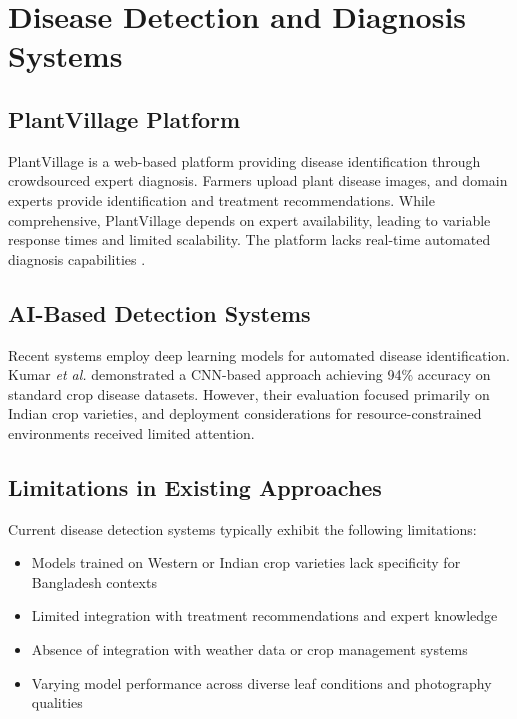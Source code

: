\documentclass[12pt,a4paper]{report}
\begin{document}
\section{Disease Detection and Diagnosis Systems}

\subsection{PlantVillage Platform}

PlantVillage is a web-based platform providing disease identification through crowdsourced expert diagnosis. Farmers upload plant disease images, and domain experts provide identification and treatment recommendations. While comprehensive, PlantVillage depends on expert availability, leading to variable response times and limited scalability. The platform lacks real-time automated diagnosis capabilities \cite{Hughes2015PlantVillage}.

\subsection{AI-Based Detection Systems}

Recent systems employ deep learning models for automated disease identification. Kumar \textit{et al.} \cite{Kumar2021DiseaseDetection} demonstrated a CNN-based approach achieving 94\% accuracy on standard crop disease datasets. However, their evaluation focused primarily on Indian crop varieties, and deployment considerations for resource-constrained environments received limited attention.

\subsection{Limitations in Existing Approaches}

Current disease detection systems typically exhibit the following limitations:
\begin{itemize}
    \item Models trained on Western or Indian crop varieties lack specificity for Bangladesh contexts
    \item Limited integration with treatment recommendations and expert knowledge
    \item Absence of integration with weather data or crop management systems
    \item Varying model performance across diverse leaf conditions and photography qualities
\end{itemize}
\end{document}
